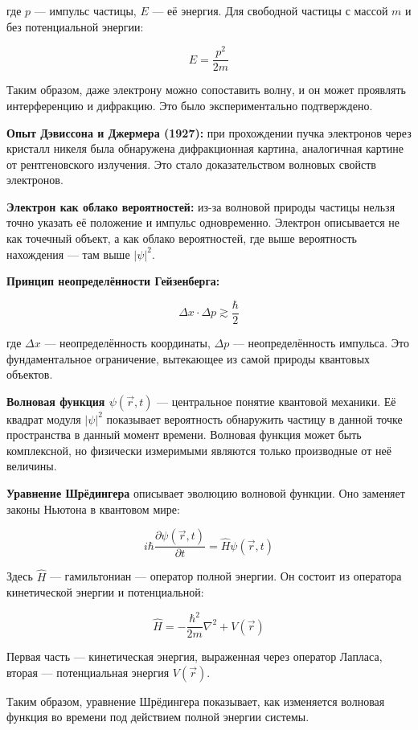 \documentclass[12pt]{article}
\begin{document}
где $p$ — импульс частицы, $E$ — её энергия. Для свободной частицы с массой $m$ и без потенциальной энергии:

\[
E = \frac{p^2}{2m}
\]

Таким образом, даже электрону можно сопоставить волну, и он может проявлять интерференцию и дифракцию. Это было экспериментально подтверждено.

\textbf{Опыт Дэвиссона и Джермера (1927):} при прохождении пучка электронов через кристалл никеля была обнаружена дифракционная картина, аналогичная картине от рентгеновского излучения. Это стало доказательством волновых свойств электронов.

\textbf{Электрон как облако вероятностей:} из-за волновой природы частицы нельзя точно указать её положение и импульс одновременно. Электрон описывается не как точечный объект, а как облако вероятностей, где выше вероятность нахождения — там выше $|\psi|^2$.

\textbf{Принцип неопределённости Гейзенберга:}

\[
\Delta x \cdot \Delta p \gtrsim \frac{\hbar}{2}
\]

где $\Delta x$ — неопределённость координаты, $\Delta p$ — неопределённость импульса. Это фундаментальное ограничение, вытекающее из самой природы квантовых объектов.

\textbf{Волновая функция $\psi(\vec{r}, t)$} — центральное понятие квантовой механики. Её квадрат модуля $|\psi|^2$ показывает вероятность обнаружить частицу в данной точке пространства в данный момент времени. Волновая функция может быть комплексной, но физически измеримыми являются только производные от неё величины.

\textbf{Уравнение Шрёдингера} описывает эволюцию волновой функции. Оно заменяет законы Ньютона в квантовом мире:

\[
i\hbar \frac{\partial \psi(\vec{r}, t)}{\partial t} = \hat{H} \psi(\vec{r}, t)
\]

Здесь $\hat{H}$ — гамильтониан — оператор полной энергии. Он состоит из оператора кинетической энергии и потенциальной:

\[
\hat{H} = -\frac{\hbar^2}{2m} \nabla^2 + V(\vec{r})
\]

Первая часть — кинетическая энергия, выраженная через оператор Лапласа, вторая — потенциальная энергия $V(\vec{r})$.

Таким образом, уравнение Шрёдингера показывает, как изменяется волновая функция во времени под действием полной энергии системы.
\end{document}

